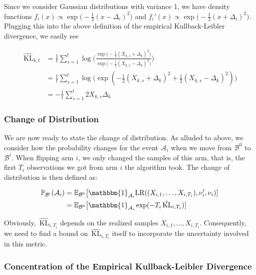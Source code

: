 \documentclass[12pt,]{article}
\newcommand{\KL}{\,\text{KL}}
\begin{document}
Since we consider Gaussian distributions with variance 1, we have
density functions
\(f_i(x) \propto \exp \big(-\frac{1}{2} (x-\Delta_i)^2\big)\) and
\(f_i'(x) \propto \exp \big(-\frac{1}{2} (x+\Delta_i)^2\big)\). Plugging
this into the above definition of the empirical Kullback-Leibler
divergence, we easily see

\begin{align*}
\hat{\KL}_{k,t} & = \frac{1}{t} \sum_{s=1}^{t} \log \big(\frac{\exp \big(-\frac{1}{2} (X_{k,s}+\Delta_k)^2\big)}{\exp \big(-\frac{1}{2} (X_{k,s}-\Delta_k)^2\big)} \big) \\
& = \frac{1}{t} \sum_{s=1}^{t} \log \big( \exp(-\frac{1}{2} (X_{k,s}+\Delta_k)^2 + \frac{1}{2} (X_{k,s}-\Delta_k)^2) \big) \\
& = - \frac{1}{t} \sum_{s=1}^{t} 2 X_{k,s} \Delta_k
\end{align*}

\subsubsection{Change of Distribution}\label{change-of-distribution}

We are now ready to state the change of distribution. As alluded to
above, we consider how the probability changes for the event
\(\mathcal{A}_i\) when we move from \(\mathcal{B}^0\) to
\(\mathcal{B}^i\). When flipping arm \(i\), we only changed the samples
of this arm, that is, the first \(T_i\) observations we got from arm
\(i\) the algorithm took. The change of distribution is then defined as:

\begin{align*}
\mathbb{P}_{\mathcal{B}^i}(\mathcal{A}_i) & = \mathbb{E}_{\mathcal{B}^0} \big[\mathbbm{1}_{\mathcal{A}_i} \text{LR}((X_{i,1}, \dots,X_{i,T_i}), \nu_i', \nu_i) ] \\
& = \mathbb{E}_{\mathcal{B}^0} \big[\mathbbm{1}_{\mathcal{A}_i} \exp (- T_i \hat{\KL}_{i,T_i}) ]
\end{align*}

Obviously, \(\hat{\KL}_{i,T_i}\) depends on the realized samples
\(X_{i,1}, \dots,X_{i,T_i}\). Consequently, we need to find a bound on
\(\hat{\KL}_{i,T_i}\) itself to incorporate the uncertainty involved in
this metric.

\subsubsection{Concentration of the Empirical Kullback-Leibler
Divergence}\label{concentration-of-the-empirical-kullback-leibler-divergence}
\end{document}
